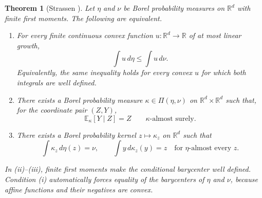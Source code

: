 \documentclass[11pt]{article}
\newcommand{\R}{\mathbb R}
\newcommand{\E}{\mathbb E}
\theoremstyle{plain}
\newtheorem{theorem}{Theorem}[section]
\theoremstyle{definition}
\theoremstyle{remark}
\begin{document}
\begin{theorem}[Strassen \cite{Strassen}]
Let $\eta$ and $\nu$ be Borel probability measures on $\R^d$ with finite first
moments. The following are equivalent.
\begin{enumerate}[label=(\roman*),leftmargin=2em]
\item For every finite continuous convex function $u:\R^d\to\R$ of at most linear
growth,
\[
 \int u\,d\eta\le\int u\,d\nu.
\]
Equivalently, the same inequality holds for every convex $u$ for which both
integrals are well defined.
\item There exists a Borel probability measure
$\kappa\in\Pi(\eta,\nu)$ on $\R^d\times\R^d$ such that, for the coordinate pair
$(Z,Y)$,
\[
 \E_\kappa[Y\mid Z]=Z\qquad\kappa\text{-almost surely}.
\]
\item There exists a Borel probability kernel $z\mapsto\kappa_z$ on $\R^d$ such
that
\[
 \int\kappa_z\,d\eta(z)=\nu,
 \qquad
 \int y\,d\kappa_z(y)=z
 \quad\text{for }\eta\text{-almost every }z.
\]
\end{enumerate}
In (ii)--(iii), finite first moments make the conditional barycenter well
defined. Condition (i) automatically forces equality of the barycenters of $\eta$
and $\nu$, because affine functions and their negatives are convex.
\end{theorem}
\end{document}
